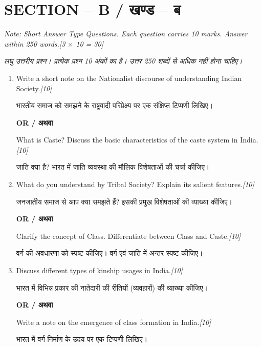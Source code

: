 \documentclass[11pt,a4paper]{article}
\newcommand{\pts}[1]{\hfill \textit{[#1]}}
\begin{document}
\bigskip

\section*{SECTION -- B / खण्ड -- ब}
\noindent \textit{Note: Short Answer Type Questions. Each question carries 10 marks. Answer within 250 words.}\pts{3 $\times$ 10 = 30}

\noindent \textit{लघु उत्तरीय प्रश्न। प्रत्येक प्रश्न 10 अंकों का है। उत्तर 250 शब्दों से अधिक नहीं होना चाहिए।}

\begin{enumerate}[label=\textbf{\arabic*.},leftmargin=*,start=2,itemsep=12pt]

  \item Write a short note on the Nationalist discourse of understanding Indian Society.\pts{10}
  
  भारतीय समाज को समझने के राष्ट्रवादी परिप्रेक्ष्य पर एक संक्षिप्त टिप्पणी लिखिए।

  \begin{center}\textbf{OR / अथवा}\end{center}

  What is Caste? Discuss the basic characteristics of the caste system in India.\pts{10}
  
  जाति क्या है? भारत में जाति व्यवस्था की मौलिक विशेषताओं की चर्चा कीजिए।

  \item What do you understand by Tribal Society? Explain its salient features.\pts{10}
  
  जनजातीय समाज से आप क्या समझते हैं? इसकी प्रमुख विशेषताओं की व्याख्या कीजिए।

  \begin{center}\textbf{OR / अथवा}\end{center}

  Clarify the concept of Class. Differentiate between Class and Caste.\pts{10}
  
  वर्ग की अवधारणा को स्पष्ट कीजिए। वर्ग एवं जाति में अन्तर स्पष्ट कीजिए।

  \item Discuss different types of kinship usages in India.\pts{10}
  
  भारत में विभिन्न प्रकार की नातेदारी की रीतियों (व्यवहारों) की व्याख्या कीजिए।

  \begin{center}\textbf{OR / अथवा}\end{center}

  Write a note on the emergence of class formation in India.\pts{10}
  
  भारत में वर्ग निर्माण के उदय पर एक टिप्पणी लिखिए।

\end{enumerate}
\end{document}

